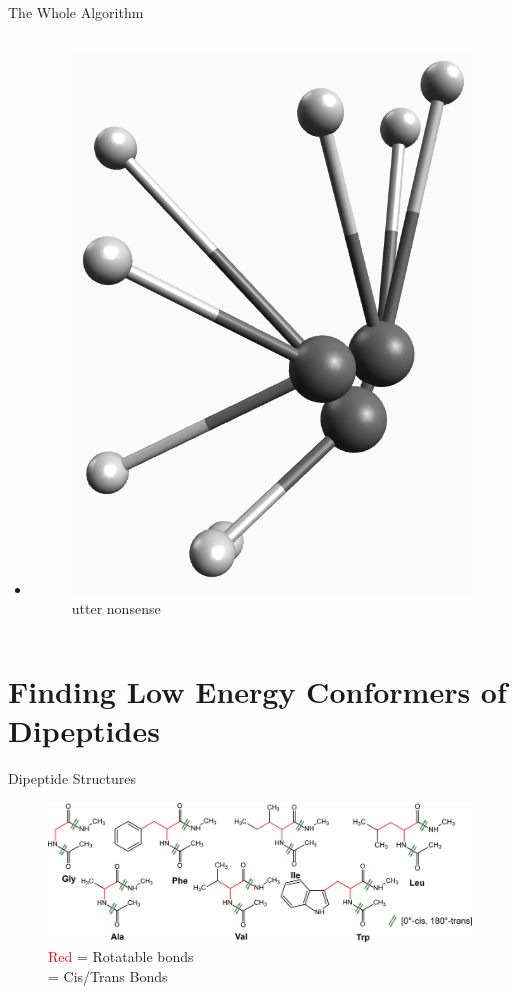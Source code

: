 \documentclass[10pt]{beamer}
\begin{document}
\begin{frame}{The Whole Algorithm}
\begin{columns}[c]
\begin{column}{0.48\textwidth}
\begin{itemize}
{				}
			    \item[]{
			    	\begin{figure}
					    \includegraphics[width=0.6\linewidth]{images/nonsense.png}
					    \caption*{utter nonsense}
					\end{figure}
				}
			\end{itemize}
		\end{column}	
	\end{columns}
\end{frame}

\section{Finding Low Energy Conformers of Dipeptides}

{%
\begin{frame}{Dipeptide Structures}
   	\begin{figure}
   		\includegraphics[width=\linewidth]{images/Supady2.jpeg}
   		\caption*{\textcolor{red}{Red} = Rotatable bonds \\
		   		  \textbf{\textcolor{darkgreen}{\ce{<=>}}} = Cis/Trans Bonds
		   		  }
   	\end{figure}
\end{frame}
}
\end{document}
